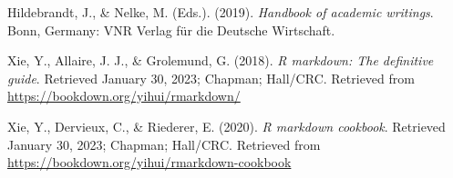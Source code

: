 \documentclass[
  12pt,
]{article}
\newlength{\cslhangindent}
\newlength{\cslentryspacingunit} %
\newenvironment{CSLReferences}[2] %
 {%
  \setlength{\parindent}{0pt}
  \ifodd #1
  \let\oldpar\par
  \def\par{\hangindent=\cslhangindent\oldpar}
  \fi
  \setlength{\parskip}{#2\cslentryspacingunit}
 }%
 {}
\begin{document}
\hypertarget{refs}{}
\begin{CSLReferences}{1}{0}
\leavevmode{}%
Hildebrandt, J., \& Nelke, M. (Eds.). (2019). \emph{Handbook of academic writings}. Bonn, Germany: VNR Verlag f{ü}r die Deutsche Wirtschaft.

\leavevmode{}%
Xie, Y., Allaire, J. J., \& Grolemund, G. (2018). \emph{R markdown: The definitive guide}. Retrieved January 30, 2023; Chapman; Hall/CRC. Retrieved from \url{https://bookdown.org/yihui/rmarkdown/}

\leavevmode{}%
Xie, Y., Dervieux, C., \& Riederer, E. (2020). \emph{R markdown cookbook}. Retrieved January 30, 2023; Chapman; Hall/CRC. Retrieved from \url{https://bookdown.org/yihui/rmarkdown-cookbook}

\end{CSLReferences}
\end{document}
